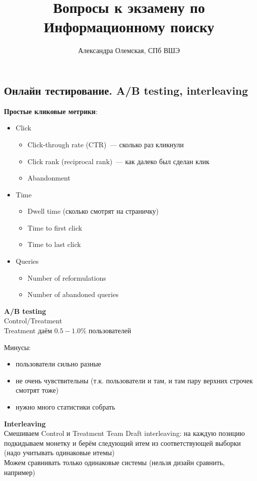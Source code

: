 \documentclass[12pt]{article}
\author{Александра Олемская, СПб ВШЭ}
\title{Вопросы к экзамену по Информационному поиску}
\begin{document}
\pagestyle{fancy}

\tableofcontents
\pagebreak


\section{} %

  \subsection{Онлайн тестирование. A/B testing, interleaving}
    {\bf Простые кликовые метрики}:
      \begin{itemize}
          \item Click
            \begin{itemize}
              \item Click-through rate (CTR)~--- сколько раз кликнули
              \item Click rank (reciprocal rank)~--- как далеко был сделан клик
              \item Abandonment
            \end{itemize}
          \item Time
            \begin{itemize}
              \item Dwell time (сколько смотрят на страничку)
              \item Time to first click
              \item Time to last click
            \end{itemize}
          \item Queries
            \begin{itemize}
              \item Number of reformulations
              \item Number of abandoned queries
            \end{itemize}
      \end{itemize}
    \smallskip
    {\bf A/B testing}\\
    Control/Treatment\\
    Treatment даём $0.5-1.0\%$ пользователей

    \smallskip
    Минусы:
      \begin{itemize}
        \item пользователи сильно разные
        \item не очень чувствительны (т.к. пользователи и там, и там пару верхних строчек смотрят тоже)
        \item нужно много статистики собрать 
      \end{itemize}
    \smallskip \smallskip
    {\bf Interleaving}\\
    Смешиваем Control и Treatment
    Team Draft interleaving: на каждую позицию подкидываем монетку и берём следующий итем из соответствующей выборки (надо учитывать одинаковые итемы)\\
    Можем сравнивать только одинаковые системы (нельзя дизайн сравнить, например)
    \pagebreak
\end{document}
